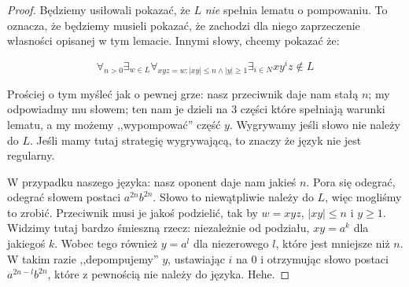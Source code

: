 \begin{proof}
    Będziemy usiłowali pokazać, że \(L\) \textit{nie} spełnia lematu o pompowaniu. To oznacza, że będziemy musieli pokazać, że zachodzi dla niego zaprzeczenie własności opisanej w tym lemacie. Innymi słowy, chcemy pokazać że:
    
    \[
        \forall_{n>0} \exists_{w \in L} \forall_{xyz=w : |xy| \leq n \land |y| \geq 1} \exists_{i \in N} xy^iz \not \in L 
    \]
    
    Prościej o tym myśleć jak o pewnej grze: nasz przeciwnik daje nam stałą \(n\); my odpowiadmy mu słowem; ten nam je dzieli na 3 części które spełniają warunki lematu, a my możemy ,,wypompować'' część \(y\). Wygrywamy jeśli słowo nie należy do \(L\). Jeśli mamy tutaj strategię wygrywającą, to znaczy że język nie jest regularny. 
    
    W przypadku naszego języka: nasz oponent daje nam jakieś \(n\). Pora się odegrać, odegrać słowem postaci \(a^{2n}b^{2n}\). Słowo to niewątpliwie należy do \(L\), więc mogliśmy to zrobić. Przeciwnik musi je jakoś podzielić, tak by \( w = xyz\), \(|xy| \leq n \) i \(y \geq 1\). Widzimy tutaj bardzo śmieszną rzecz: niezależnie od podziału, \(xy = a^k\) dla jakiegoś \(k\). Wobec tego również \(y = a^l\) dla niezerowego \(l\), które jest mniejsze niż \(n\). W takim razie ,,depompujemy'' \(y\), ustawiając \(i\) na 0 i otrzymując słowo postaci \(a^{2n-l}b^{2n}\), które z pewnością nie należy do języka. Hehe. 
\end{proof}

